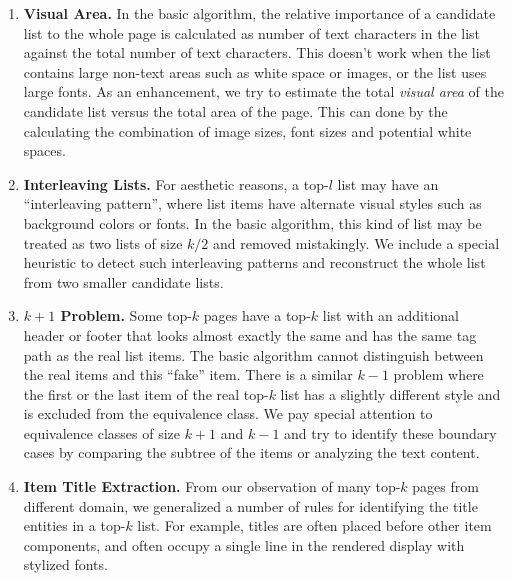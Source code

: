 \begin{enumerate}
\item {\bf Visual Area.}
In the basic algorithm, the relative importance of a candidate list to the
whole page is calculated as number of text characters in the list against
the total number of text characters. This doesn't work when the list
contains large non-text areas such as white space or images, or the list
uses large fonts. As an enhancement, we try to estimate the total 
{\em visual area} of the candidate list versus the total area of the page.
This can done by the calculating the combination of image sizes, font sizes 
and potential white spaces.

\item {\bf Interleaving Lists.} For aesthetic reasons, a top-$l$ list may 
have an ``interleaving pattern'', where list items have alternate visual styles
such as background colors or fonts. In the basic algorithm, 
this kind of list may be treated as two lists of size $k/2$ and removed
mistakingly. We include a special heuristic to detect such interleaving
patterns and reconstruct the whole list from two smaller candidate lists. 

\item {\bf $k+1$ Problem.}
Some top-$k$ pages have a top-$k$ list with an additional header or footer
that looks almost exactly the same and has the same tag path
as the real list items. 
The basic algorithm cannot distinguish between the real items and this
``fake'' item. There is a similar $k-1$ problem where the first or the last
item of the real top-$k$ list has a slightly different style and is excluded
from the equivalence class. We pay special attention to equivalence classes
of size $k+1$ and $k-1$ and try to identify these boundary cases by
comparing the subtree of the items or analyzing the text content.

\item {\bf Item Title Extraction.} From our observation of many top-$k$ pages from 
different domain, we generalized a number of rules for identifying the
title entities in a top-$k$ list. For example, titles are often placed before
other item components, and often occupy a single line in the rendered
display with stylized fonts.
\end{enumerate}


